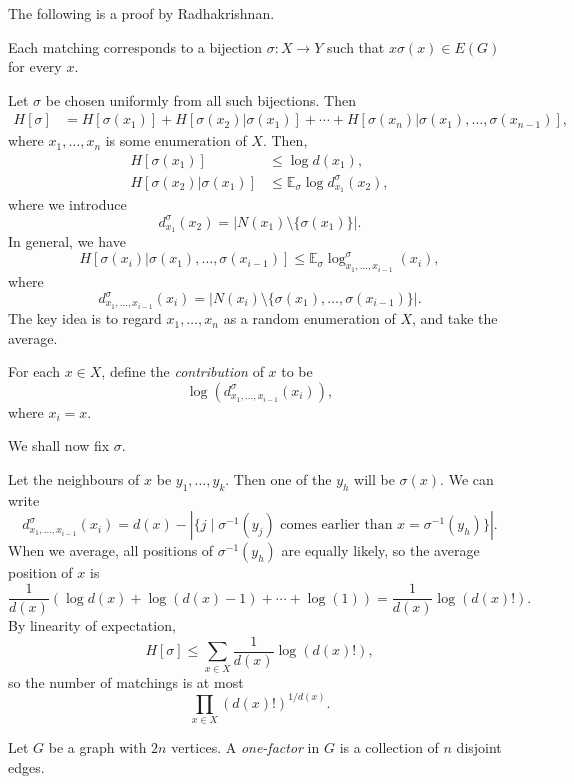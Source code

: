 \documentclass[12pt]{article}
\begin{document}
\begin{proofbox}
	The following is a proof by Radhakrishnan.

	Each matching corresponds to a bijection $\sigma : X \to Y$ such that $x \sigma(x) \in E(G)$ for every $x$.

	Let $\sigma$ be chosen uniformly from all such bijections. Then
	\begin{align*}
		H[\sigma] &= H[\sigma(x_1)] + H[\sigma(x_2)|\sigma(x_1)] + \cdots + H[\sigma(x_n)|\sigma(x_1),\ldots,\sigma(x_{n-1})],
	\end{align*}
	where $x_1, \ldots, x_n$ is some enumeration of $X$. Then,
	\begin{align*}
		H[\sigma(x_1)] & \leq \log d(x_1), \\
		H[\sigma(x_2)|\sigma(x_1)] &\leq \mathbb{E}_\sigma \log d_{x_1}^{\sigma}(x_2),
	\end{align*}
	where we introduce
	\[
		d_{x_1}^{\sigma}(x_2) = | N(x_1) \setminus \{ \sigma(x_1)\}|.
	\]
	In general, we have
	\[
		H[\sigma(x_i)|\sigma(x_1),\ldots,\sigma(x_{i-1})] \leq \mathbb{E}_\sigma \log_{x_1,\ldots,x_{i-1}}^{\sigma}(x_i),
	\]
	where
	\[
		d_{x_1,\ldots,x_{i-1}}^{\sigma}(x_i) = |N(x_i) \setminus \{\sigma(x_1), \ldots, \sigma(x_{i-1})\}|.
	\]
	The key idea is to regard $x_1, \ldots, x_n$ as a random enumeration of $X$, and take the average.

	For each $x \in X$, define the \emph{contribution} of $x$ to be
	\[
	\log ( d_{x_1, \ldots, x_{i-1}}^{\sigma} (x_i)),
	\]
	where $x_i = x$.

	We shall now fix $\sigma$.

	Let the neighbours of $x$ be $y_1, \ldots, y_k$. Then one of the $y_h$ will be $\sigma(x)$. We can write
	\[
		d_{x_1, \ldots, x_{i-1}}^{\sigma}(x_i) = d(x) - \left|\{j \mid \sigma^{-1}(y_j) \text{ comes earlier than $x = \sigma^{-1}(y_h)$}\}\right|.
	\]
	When we average, all positions of $\sigma^{-1}(y_h)$ are equally likely, so the average position of $x$ is
	\[
	\frac{1}{d(x)} (\log d(x) + \log (d(x) - 1) + \cdots + \log(1)) = \frac{1}{d(x)} \log(d(x)!).
	\]
	By linearity of expectation,
	\[
		H[\sigma] \leq \sum_{x \in X} \frac{1}{d(x)} \log(d(x)!),
	\]
	so the number of matchings is at most
	\[
	\prod_{x \in X}(d(x)!)^{1/d(x)}.
	\]
\end{proofbox}

\begin{definition}
	Let $G$ be a graph with $2n$ vertices. A \emph{one-factor} in $G$ is a collection of $n$ disjoint edges.
\end{definition}
\end{document}
